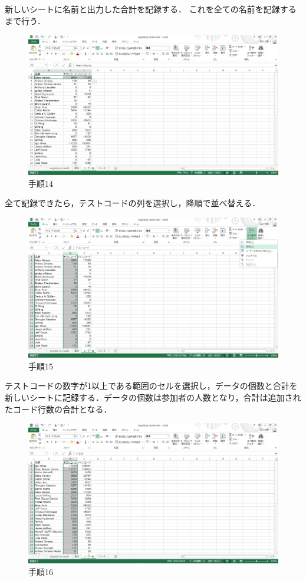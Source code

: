 \newpage

新しいシートに名前と出力した合計を記録する．
これを全ての名前を記録するまで行う．

\begin{figure}[h]
\centering
\includegraphics[width=13cm]{process14.png}
\caption{手順14}
\end{figure}

全て記録できたら，テストコードの列を選択し，降順で並べ替える．

\begin{figure}[h]
\centering
\includegraphics[width=13cm]{process15.png}
\caption{手順15}
\end{figure}

\newpage

テストコードの数字が1以上である範囲のセルを選択し，データの個数と合計を新しいシートに記録する．データの個数は参加者の人数となり，合計は追加されたコード行数の合計となる．

\begin{figure}[h]
\centering
\includegraphics[width=13cm]{process16.png}
\caption{手順16}
\end{figure}

